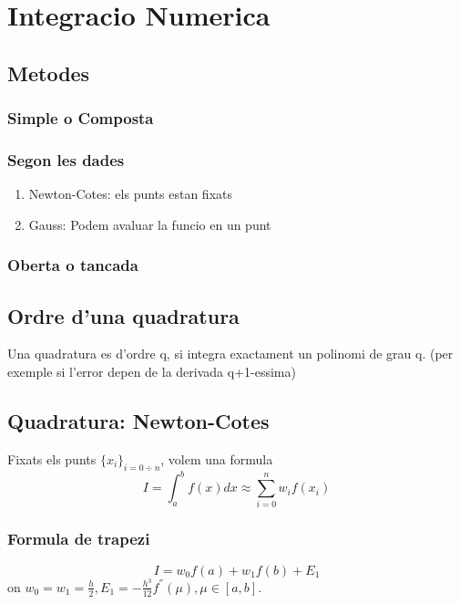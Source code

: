 \documentclass[11pt]{article}
\date{\today}
\title{}
\begin{document}
\tableofcontents

\section{Integracio Numerica}
\label{sec:org9c6a943}

\subsection{Metodes}
\label{sec:org44c12d5}

\subsubsection{Simple o Composta}
\label{sec:orge1d3555}

\subsubsection{Segon les dades}
\label{sec:org46af586}
\begin{enumerate}
\item Newton-Cotes: els punts estan fixats
\label{sec:org1dcde48}
\item Gauss: Podem avaluar la funcio en un punt
\label{sec:org707793b}
\end{enumerate}
\subsubsection{Oberta o tancada}
\label{sec:org7fd74db}

\subsection{Ordre d'una quadratura}
\label{sec:org19f78b7}
Una quadratura es d'ordre q, si integra exactament un polinomi de grau q. (per exemple si l'error depen de la derivada q+1-essima)

\subsection{Quadratura: Newton-Cotes}
\label{sec:org10b6174}
Fixats els punts \(\{x_{i} \}_{i=0\div n}\), volem una formula
\[ I = \int_{a}^{b} f(x) dx \approx \sum_{i=0}^{n} w_{i}f(x_i) \]


\subsubsection{Formula de trapezi}
\label{sec:org2b7ac8b}
\[ I = w_{0}f(a) + w_{1}f(b) + E_{1} \] 
on \(w_{0} = w_{1} = \frac{h}{2}, E_{1} = -\frac{h^3}{12}f^{''}(\mu), \mu \in [a,b].\)
\end{document}

